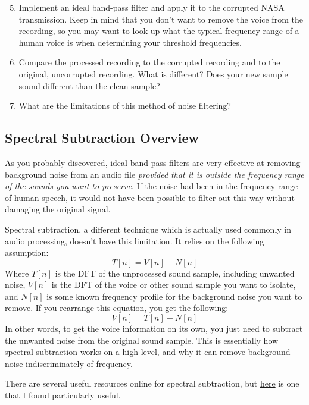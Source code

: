 \documentclass{tufte-handout}
\begin{document}
\begin{enumerate}
	\setcounter{enumi}{4}
	\item Implement an ideal band-pass filter and apply it to the corrupted NASA transmission. Keep in mind that you don't want to remove the voice from the recording, so you may want to look up what the typical frequency range of a human voice is when determining your threshold frequencies.
	\item Compare the processed recording to the corrupted recording and to the original, uncorrupted recording. What is different? Does your new sample sound different than the clean sample?
	\item What are the limitations of this method of noise filtering?
\end{enumerate}

\subsection{Spectral Subtraction Overview}
As you probably discovered, ideal band-pass filters are very effective at removing background noise from an audio file \textit{provided that it is outside the frequency range of the sounds you want to preserve}. If the noise had been in the frequency range of human speech, it would not have been possible to filter out this way without damaging the original signal.

Spectral subtraction, a different technique which is actually used commonly in audio processing, doesn't have this limitation. It relies on the following assumption:
\begin{equation}
	T[n] = V[n] + N[n]
\end{equation}
Where $T[n]$  is the DFT of the unprocessed sound sample, including unwanted noise, $V[n]$ is the DFT of the voice or other sound sample you want to isolate, and $N[n]$ is some known frequency profile for the background noise you want to remove. If you rearrange this equation, you get the following:
\begin{equation}
	V[n] = T[n] - N[n]
\end{equation}
In other words, to get the voice information on its own, you just need to subtract the unwanted noise from the original sound sample. This is essentially how spectral subtraction works on a high level, and why it can remove background noise indiscriminately of frequency.

There are several useful resources online for spectral subtraction, but \href{http://practicalcryptography.com/miscellaneous/machine-learning/tutorial-spectral-subraction/}{here} is one that I found particularly useful.
\end{document}

